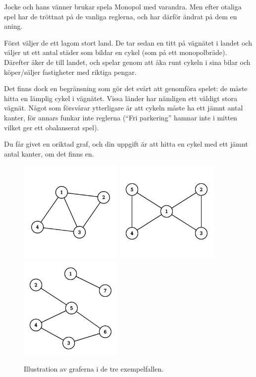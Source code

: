 Jocke och hans vänner brukar spela Monopol med varandra. Men efter otaliga spel har de tröttnat
på de vanliga reglerna, och har därför ändrat på dem en aning.

Först väljer de ett lagom stort land. De tar sedan en titt på vägnätet i landet och väljer ut ett
antal städer som bildar en cykel (som på ett monopolbräde). Därefter åker de till landet, och spelar
genom att åka runt cykeln i sina bilar och köper/säljer fastigheter med riktiga pengar.


Det finns dock en begränsning som gör det svårt att genomföra spelet: de måste hitta en lämplig
cykel i vägnätet. Vissa länder har nämligen ett väldigt stora vägnät. Något som försvårar ytterligare är 
att cykeln måste ha ett jämnt antal kanter, för annars funkar inte reglerna (``Fri parkering'' hamnar inte
i mitten vilket ger ett obalanserat spel).


Du får givet en oriktad graf, och din uppgift är att hitta en cykel med ett jämnt antal kanter, 
om det finns en.

\begin{figure}[!h]
  \centering
  \includegraphics[width=5cm]{sample1.png}
  \quad
  \includegraphics[width=5cm]{sample2.png}
  \quad
  \includegraphics[width=5cm]{sample3.png}
  \caption{Illustration av graferna i de tre exempelfallen.}
\end{figure}

